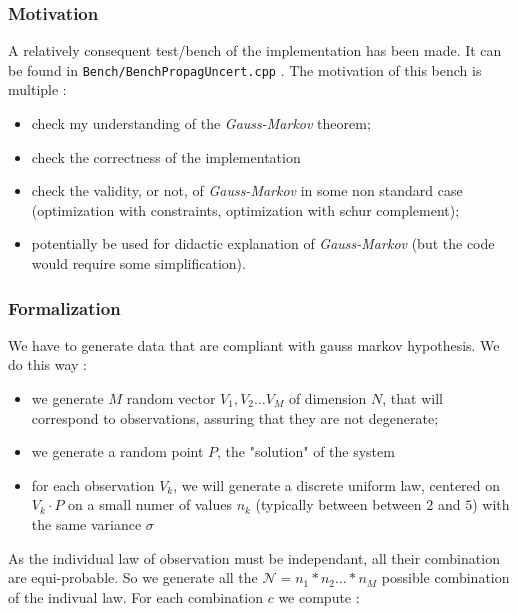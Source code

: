 \subsubsection{Motivation}
A relatively consequent test/bench of the implementation has been made. 
It can be found in {\tt Bench/BenchPropagUncert.cpp} . The motivation
of this bench is multiple :

\begin{itemize}
     \item check my understanding of the \emph{Gauss-Markov} theorem;
     \item check the correctness of the implementation
     \item check the  validity, or not, of \emph{Gauss-Markov} in some non
	     standard case (optimization with constraints, optimization with schur complement);
     \item potentially be used for didactic explanation of \emph{Gauss-Markov}
	     (but the code would require some simplification).
\end{itemize}

\subsubsection{Formalization}

We have to generate data that are compliant with  gauss markov hypothesis. We do this way :

\begin{itemize}
     \item we generate $M$ random vector $V_1,V_2 \dots V_M$ of dimension $N$, that will correspond to 
           observations, assuring that they are not degenerate;

     \item we generate a random point $P$, the "solution" of the system

     \item for each observation  $V_k$, we will generate a discrete uniform law, centered on $V_k \cdot P$
	    on a small numer of values $n_k$ (typically between between $2$ and $5$) with the same variance $\sigma$
\end{itemize}

As the individual law of observation must be independant, all their combination are equi-probable. So
we generate all the $\mathcal{N} = n_1 * n_2 \dots * n_M$ possible combination of the indivual law.  For each
combination $c$  we compute :

